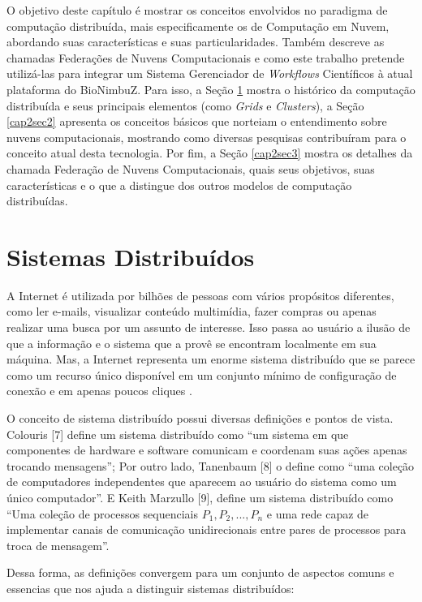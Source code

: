 O objetivo deste capítulo é mostrar os conceitos envolvidos no paradigma de computação distribuída, mais especificamente os de Computação em Nuvem, abordando suas características e suas particularidades. Também descreve as chamadas Federações de Nuvens Computacionais e como este trabalho pretende utilizá-las para integrar um Sistema Gerenciador de \textit{Workflows} Científicos à atual plataforma do BioNimbuZ. Para isso, a Seção \ref{cap2sec1} mostra o histórico da computação distribuída e seus principais elementos (como \textit{Grids} e \textit{Clusters}), a Seção \ref{cap2sec2} apresenta os conceitos básicos que norteiam o entendimento sobre nuvens computacionais, mostrando como diversas pesquisas contribuíram para o conceito atual desta tecnologia. Por fim, a Seção \ref{cap2sec3} mostra os detalhes da chamada Federação de Nuvens Computacionais, quais seus objetivos, suas características e o que a distingue dos outros modelos de computação distribuídas. 

\section{Sistemas Distribuídos} \label{cap2sec1}

A Internet é utilizada por bilhões de pessoas com vários propósitos diferentes, como ler e-mails, visualizar conteúdo multimídia, fazer compras ou apenas realizar uma busca por um assunto de interesse. Isso passa ao usuário a ilusão de que a informação e o sistema que a provê se encontram localmente em sua máquina. Mas, a Internet representa um enorme sistema distribuído que se parece como um recurso único disponível em um conjunto mínimo de configuração de conexão e em apenas poucos cliques \cite{cloud_360}.

O conceito de sistema distribuído possui diversas definições e pontos de vista. Colouris [7] define um sistema distribuído como ``um sistema em que componentes de hardware e software comunicam e coordenam suas ações apenas trocando mensagens''; Por outro lado, Tanenbaum [8] o define como ``uma coleção de computadores independentes que aparecem ao usuário do sistema como um único computador''. E Keith Marzullo [9], define um sistema distribuído como ``Uma coleção de processos sequenciais $P_1, P_2, ..., P_n$ e uma rede capaz de implementar canais de comunicação unidirecionais entre pares de processos para troca de mensagem''. 

Dessa forma, as definições convergem para um conjunto de aspectos comuns e essencias que nos ajuda a distinguir sistemas distribuídos: 

